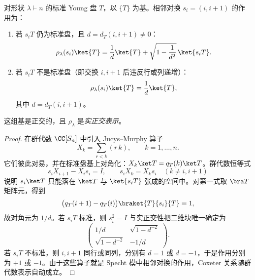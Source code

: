 \begin{theorem}
对形状 $\lambda\vdash n$ 的标准 Young 盘 $T$，以 $\{T\}$ 为基。相邻对换 $s_i=(i,i+1)$ 的作用为：
\begin{enumerate}[label=(\roman*),leftmargin=3em]
\item 若 $s_iT$ 仍为标准盘，且 $d=d_T(i,i+1)\neq0$：
\begin{equation}
\rho_\lambda(s_i)\ket{T}
=\frac{1}{d}\ket{T}+\sqrt{1-\frac{1}{d^2}}\,\ket{s_iT}.
\label{eq:young-yamanouchi-matrix}
\end{equation}
\item 若 $s_iT$ 不是标准盘（即交换 $i,i+1$ 后违反行或列递增）：
\begin{equation}
\rho_\lambda(s_i)\ket{T}=\frac{1}{d}\ket{T},
\label{eq:young-yamanouchi-diagonal}
\end{equation}
其中 $d=d_T(i,i+1)$。
\end{enumerate}
这组基是正交的，且 $\rho_\lambda$ 是\emph{实正交表示}。
\label{thm:young-yamanouchi}
\end{theorem}

\begin{proof}
在群代数 $\CC[S_n]$ 中引入 Jucys--Murphy 算子
\[
X_k=\sum_{r<k}(r\,k),\qquad k=1,\dots,n.
\]
它们彼此对易，并在标准盘基上对角化：$X_k\ket T=q_T(k)\ket T$。群代数恒等式
\[
s_iX_{i+1}-X_is_i=I,
\qquad
s_iX_k=X_ks_i\quad(k\ne i,i+1)
\]
说明 $s_i\ket T$ 只能落在 $\ket T$ 与 $\ket{s_iT}$ 张成的空间中。对第一式取 $\bra T$ 矩阵元，得到
\[
\bigl(q_T(i+1)-q_T(i)\bigr)\braket{T}{s_i}{T}=1,
\]
故对角元为 $1/d$。若 $s_iT$ 标准，则 $s_i^2=I$ 与实正交性把二维块唯一确定为
\[
\begin{pmatrix}
1/d&\sqrt{1-d^{-2}}\\
\sqrt{1-d^{-2}}&-1/d
\end{pmatrix}.
\]
若 $s_iT$ 不标准，则 $i,i+1$ 同行或同列，分别有 $d=1$ 或 $d=-1$，于是作用分别为 $+1$ 或 $-1$。由于这些算子就是 Specht 模中相邻对换的作用，Coxeter 关系随群代数表示自动成立。
\end{proof}


\par\medskip
\par\medskip

